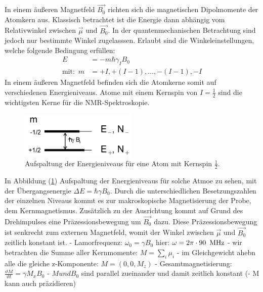 In einem \"{a}u{\ss}eren Magnetfeld $\overrightarrow{B_0}$ richten sich die magnetischen Dipolmomente der Atomkern aus.
Klassisch betrachtet ist die Energie dann abh\"{a}ngig vom Relativwinkel zwischen $\overrightarrow{\mu}$ und $\overrightarrow{B_0}$.
In der quantenmechanischen Betrachtung sind jedoch nur bestimmte Winkel zugelasssen.
Erlaubt sind die Winkeleinstellungen, welche folgende Bedingung erf\"{u}llen:
\begin{align}
	E &= -m \hbar \gamma_I B_0  \\
	\text{mit:} \, \, \,  m &= +I, +(I-1), ..., -(I-1), -I \nonumber
\end{align}
In einem \"{a}u{\ss}eren Magnetfeld befinden sich die Atomkerne somit auf verschiedenen Energieniveaus.
Atome mit einem Kernspin von $I=\frac{1}{2}$ sind die wichtigsten Kerne für die NMR-Spektroskopie.
\begin{figure}[hbtp]
	\centering
	\includegraphics[width=0.5\textwidth]{Plots/energieniveaus.png}
	\caption{Aufspaltung der Energieniveaus f\"{u}r eine Atom mit Kernspin $\frac{1}{2}$.}
	\label{Energieniveaus}
\end{figure}
In Abbildung (\ref{Energieniveaus}) Aufspaltung der Energieniveaus f\"{u}r solche Atmoe zu sehen, mit der \"{U}bergangsenergie $\Delta E = \hbar \gamma B_0$.
Durch die unterschiedlichen Besetzungszahlen der einzelnen Niveaus kommt es zur  makroskopische Magnetisierung der Probe, dem Kernmagnetismus.
Zus\"{a}tzlich zu der Ausrichtung kommt auf Grund des Drehimpulses eine Pr\"{a}zessionsbewegung um $\overrightarrow{B_0}$ dazu.
Diese Pr\"{a}zessionsbewegung ist senkrecht zum externen Magnetfeld, womit der Winkel zwischen $\overrightarrow{\mu}$ und $\overrightarrow{B_0}$ zeitlich konstant ist.
- Lamorfrequenz: $\omega_0 = \gamma B_0$ hier: $\omega = 2\pi \cdot 90 \text{\, MHz}$
- wir betrachten die Summe aller Kernmomente: $M = \sum_i \mu_i$
- im Gleichgewicht ahebn alle die gleiche z-Komponente: $M = (0,0,M_z)$
- Gesamtmagnetisierung: $\frac{\vartheta M}{\vartheta t} = \gamma M_x B_0$
- $M und B_0$ sind parallel zueinander und damit zeitlich konstant
(- M kann auch pr\"{a}zidieren)

